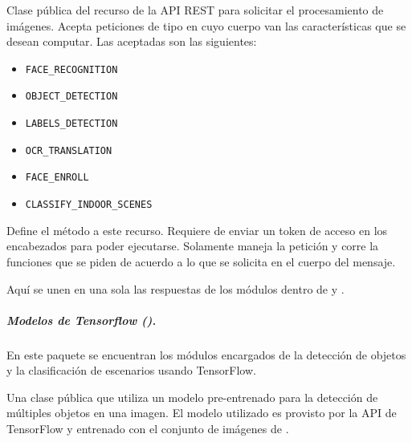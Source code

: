 
Clase pública del recurso de la API REST para solicitar el procesamiento
de imágenes. Acepta peticiones de tipo  en cuyo cuerpo van las
características que se desean computar. Las aceptadas son las siguientes:
\begin{itemize}
\item {}
\texttt{FACE\_RECOGNITION}

\item {}
\texttt{OBJECT\_DETECTION}

\item {}
\texttt{LABELS\_DETECTION}

\item {}
\texttt{OCR\_TRANSLATION}

\item {}
\texttt{FACE\_ENROLL}

\item {}
\texttt{CLASSIFY\_INDOOR\_SCENES}

\end{itemize}

\begin{fulllineitems}
\label{\detokenize{chapter_two/desc_cloudnao:app.resources.vision.Vision.post}}
Define el método  a este recurso. Requiere de enviar un token
de acceso en los encabezados para poder ejecutarse. Solamente maneja la
petición y corre la funciones que se piden de acuerdo a lo que se
solicita en el cuerpo del mensaje.

Aquí se unen en una sola las respuestas de los módulos dentro de
 y .

\end{fulllineitems}



\subparagraph{Modelos de Tensorflow ().}
En este paquete se encuentran los módulos encargados de la 
detección de objetos y la clasificación de escenarios usando
TensorFlow.



Una clase pública que utiliza un modelo pre-entrenado para la detección
de múltiples objetos en una imagen. El modelo utilizado es
 provisto por la API de TensorFlow y entrenado con el
conjunto de imágenes de .

